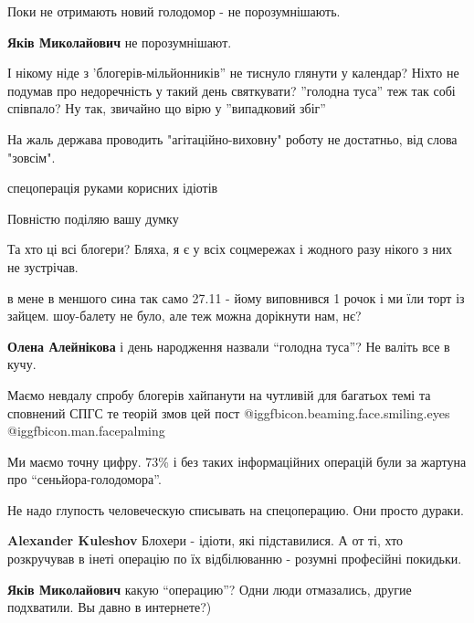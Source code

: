 \begin{itemize}
Поки не отримають новий голодомор - не порозумнішають.

\textbf{Яків Миколайович} не порозумнішают.


І нікому ніде з 'блогерів-мільйонників'' не тиснуло глянути у календар? Ніхто
не подумав про недоречність у такий день святкувати? ''голодна туса'' теж так
собі співпало? Ну так, звичайно що вірю у ''випадковий збіг''

На жаль держава проводить "агітаційно-виховну" роботу не достатньо, від слова "зовсім".

спецоперація руками корисних ідіотів

Повністю поділяю вашу думку

Та хто ці всі блогери?
Бляха, я є у всіх соцмережах і жодного разу нікого з них не зустрічав.


в мене в меншого сина так само 27.11 - йому виповнився 1 рочок і ми їли торт із
зайцем. шоу-балету не було, але теж можна дорікнути нам, нє?

\begin{itemize} %
\textbf{Олена Алейнікова} і день народження назвали \enquote{голодна туса}? Не валіть все в кучу.
\end{itemize} %

Маємо невдалу спробу блогерів хайпанути на чутливій для багатьох темі та сповнений СПГС те теорій змов цей пост
 @igg{fbicon.beaming.face.smiling.eyes}  @igg{fbicon.man.facepalming} 

Ми маємо точну цифру. 73\% і без таких інформаційних операцій були за жартуна про \enquote{сеньйора-голодомора}.

Не надо глупость человеческую списывать на спецоперацию. Они просто дураки.

\begin{itemize} %
\textbf{Alexander Kuleshov} Блохери - ідіоти, які підставилися. А от ті, хто розкручував в інеті операцію по їх відбілюванню - розумні професійні покидьки.

\textbf{Яків Миколайович} какую \enquote{операцию}? Одни люди отмазались, другие подхватили. Вы давно в интернете?)
\end{itemize} %


\end{itemize}
